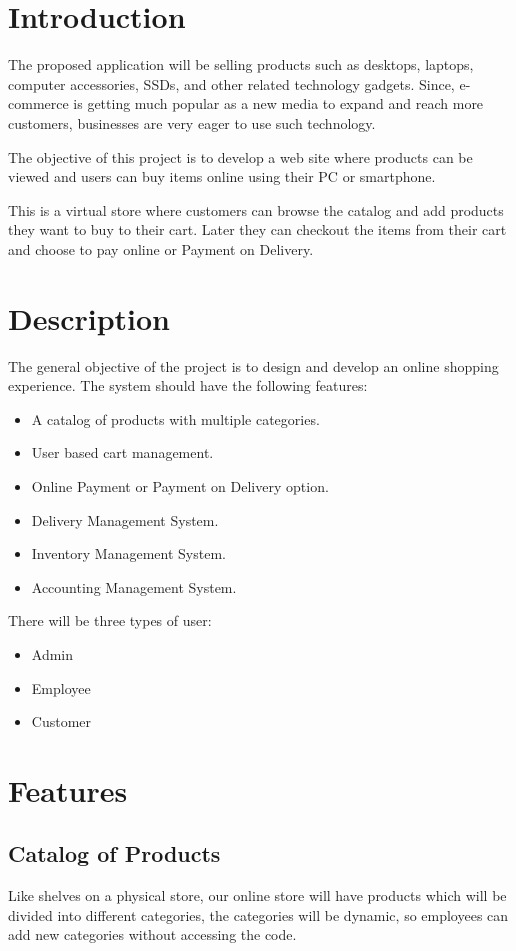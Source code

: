 \documentclass[12pt]{article}
\begin{document}
\section{Introduction}
The proposed application will be selling products such as desktops, laptops, computer accessories, SSDs, and other related technology gadgets. Since, e-commerce is getting much popular as a new media to expand and reach more customers, businesses are very eager to use such technology. \par
The objective of this project is to develop a web site where products can be viewed and users can buy items online using their PC or smartphone. \par
This is a virtual store where customers can browse the catalog and add products they want to buy to their cart. Later they can checkout the items from their cart and choose to pay online or Payment on Delivery.

\section{Description}
The general objective of the project is to design and develop an online shopping experience. The system should have the following features: \par
\begin{itemize}
    \item A catalog of products with multiple categories.
    \item User based cart management.
    \item Online Payment or Payment on Delivery option.
    \item Delivery Management System.
    \item Inventory Management System.
    \item Accounting Management System.
\end{itemize}
There will be three types of user: \par
\begin{itemize}
    \item Admin
    \item Employee
    \item Customer
\end{itemize}

\section{Features}
\subsection{Catalog of Products}
Like shelves on a physical store, our online store will have products which will be divided into different categories, the categories will be dynamic, so employees can add new categories without accessing the code.
\end{document}
